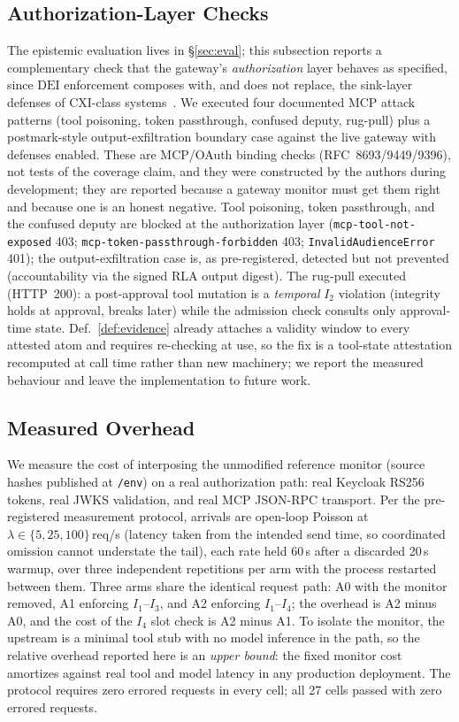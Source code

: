 \documentclass[conference,compsoc]{IEEEtran}
\theoremstyle{definition}
\theoremstyle{plain}
\newcommand{\Ione}{\ensuremath{I_1}}
\newcommand{\Itwo}{\ensuremath{I_2}}
\newcommand{\Ithree}{\ensuremath{I_3}}
\newcommand{\Ifour}{\ensuremath{I_4}}
\newcommand{\DEI}{\ensuremath{\mathrm{DEI}}}
\begin{document}
\subsection{Authorization-Layer Checks}
\label{sec:redteam}
The epistemic evaluation lives in \S\ref{sec:eval}; this subsection
reports a complementary check that the gateway's \emph{authorization}
layer behaves as specified, since \DEI{} enforcement composes with,
and does not replace, the sink-layer defenses of CXI-class
systems~\cite{cxi,camel}. We executed four documented MCP attack
patterns (tool poisoning, token passthrough, confused deputy, rug-pull)
plus a postmark-style output-exfiltration boundary case against the
live gateway with defenses enabled. These are MCP/OAuth binding checks
(RFC~8693/9449/9396), not tests of the coverage claim, and they were
constructed by the authors during development; they are reported
because a gateway monitor must get them right and because one is an
honest negative. Tool poisoning, token passthrough, and the confused
deputy are blocked at the authorization layer (\texttt{mcp-tool-not-exposed}
403; \texttt{mcp-token-passthrough-forbidden} 403;
\texttt{InvalidAudienceError} 401); the output-exfiltration case is,
as pre-registered, detected but not prevented (accountability via the
signed RLA output digest). The rug-pull executed (HTTP~200): a
post-approval tool mutation is a \emph{temporal} \Itwo{} violation
(integrity holds at approval, breaks later) while the admission check
consults only approval-time state. Def.~\ref{def:evidence} already
attaches a validity window to every attested atom and requires
re-checking at use, so the fix is a tool-state attestation recomputed at
call time rather than new machinery; we report the measured behaviour
and leave the implementation to future work.

\subsection{Measured Overhead}
\label{sec:overhead}
We measure the cost of interposing the unmodified reference
monitor (source hashes published at \texttt{/env}) on a real
authorization path: real Keycloak RS256 tokens, real JWKS
validation, and real MCP JSON-RPC transport. Per the
pre-registered measurement protocol, arrivals are open-loop
Poisson at $\lambda \in \{5, 25, 100\}$\,req/s (latency taken from
the intended send time, so coordinated omission cannot understate
the tail), each rate held 60\,s after a discarded 20\,s warmup,
over three independent repetitions per arm with the process
restarted between them. Three arms share the identical request path:
A0 with the monitor removed, A1 enforcing \Ione--\Ithree, and A2
enforcing \Ione--\Ifour; the overhead is A2 minus A0, and the cost of
the \Ifour{} slot check is A2 minus A1. To isolate the monitor, the
upstream is a minimal tool stub with no model inference in the path, so
the relative overhead reported here is an \emph{upper bound}: the fixed
monitor cost amortizes against real tool and model latency in any
production deployment. The protocol requires zero errored requests in
every cell; all 27 cells passed with zero errored requests.
\end{document}
